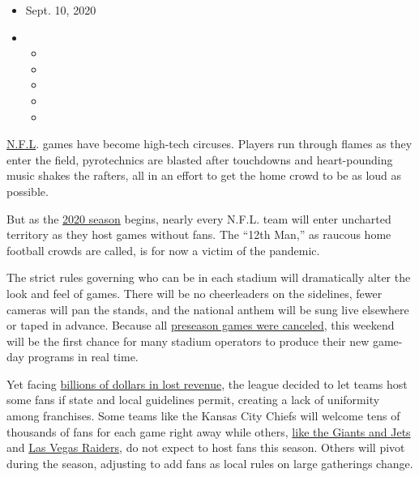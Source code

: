 \begin{itemize}
\item
  Sept. 10, 2020
\item
  \begin{itemize}
  \item
  \item
  \item
  \item
  \item
  \end{itemize}
\end{itemize}

\href{https://www.nytimes3xbfgragh.onion/2020/09/10/sports/football/nfl-picks-week-1.html}{N.F.L}.
games have become high-tech circuses. Players run through flames as they
enter the field, pyrotechnics are blasted after touchdowns and
heart-pounding music shakes the rafters, all in an effort to get the
home crowd to be as loud as possible.

But as the
\href{https://www.nytimes3xbfgragh.onion/2020/09/10/sports/football/nfl-season-open-covid.html}{2020
season} begins, nearly every N.F.L. team will enter uncharted territory
as they host games without fans. The ``12th Man,'' as raucous home
football crowds are called, is for now a victim of the pandemic.

The strict rules governing who can be in each stadium will dramatically
alter the look and feel of games. There will be no cheerleaders on the
sidelines, fewer cameras will pan the stands, and the national anthem
will be sung live elsewhere or taped in advance. Because all
\href{https://www.nytimes3xbfgragh.onion/2020/07/14/sports/football/nfl-players-training-camp.html}{preseason
games were canceled}, this weekend will be the first chance for many
stadium operators to produce their new game-day programs in real time.

Yet facing
\href{https://www.nytimes3xbfgragh.onion/2020/07/02/sports/football/nfl-salary-cap-no-fans.html}{billions
of dollars in lost revenue}, the league decided to let teams host some
fans if state and local guidelines permit, creating a lack of uniformity
among franchises. Some teams like the Kansas City Chiefs will welcome
tens of thousands of fans for each game right away while others,
\href{https://www.nytimes3xbfgragh.onion/2020/07/20/sports/football/jets-giants-rutgers-fans-metlife-stadium.html}{like
the Giants and Jets} and
\href{https://www.nfl.com/news/raiders-allegiant-stadium-will-be-closed-to-fans-for-2020-season}{Las
Vegas Raiders}, do not expect to host fans this season. Others will
pivot during the season, adjusting to add fans as local rules on large
gatherings change.

